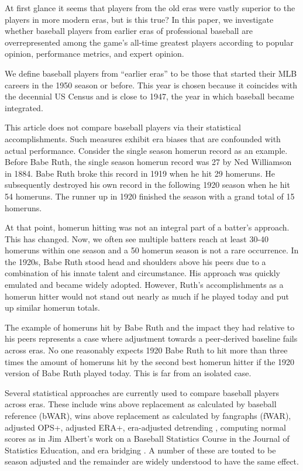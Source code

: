\documentclass[11pt]{article}\usepackage[]{graphicx}\usepackage[]{color}
\begin{document}
At first glance 
it seems that players from the old eras were vastly superior to the 
players in more modern eras, but is this true? 
In this paper, we investigate whether baseball players from earlier 
eras of professional baseball are overrepresented among the game's all-time 
greatest players according to popular opinion, performance metrics, and expert 
opinion.  

We define baseball players from ``earlier eras'' to be those that 
started their MLB careers in the 1950 season or before.  
This year is chosen because it coincides with the decennial US Census 
and is close to 1947, the year in which baseball became integrated. 

This article does not compare baseball players via their statistical 
accomplishments.  Such measures exhibit era biases that are confounded with 
actual performance.  Consider the single season homerun record as an example. 
Before Babe Ruth, the single season homerun record was 27 by Ned Williamson in 
1884.  
Babe Ruth broke this record in 1919 
when he hit 29 homeruns.  He subsequently destroyed his own record in 
the following 1920 season when he hit 54 homeruns.  The runner up in 1920 
finished the season with a grand total of 15 homeruns.  

At that point, 
homerun hitting was not an integral part of a batter's approach. %
This has changed. Now, we often see multiple batters reach at least 30-40 
homeruns within one season and a 50 homerun season is not a rare 
occurrence. %
In the 1920s, Babe Ruth stood head and shoulders above his peers due to a 
combination of his innate talent and circumstance.  
His approach was quickly emulated and became widely adopted. %
However, Ruth's accomplishments as a homerun hitter would not stand out nearly 
as much if he played today and put up similar homerun totals.    

The example of homeruns hit by Babe Ruth and the impact they had relative 
to his peers represents a case where adjustment towards a peer-derived 
baseline fails across eras.  No one reasonably expects 1920 Babe Ruth to hit 
more than three times the amount of homeruns hit by the second best homerun 
hitter if the 1920 version of Babe Ruth played today.  
This is far from an isolated case.  

Several statistical approaches are currently used to compare baseball 
players across eras. 
These include 
wins above replacement as calculated by baseball reference (bWAR), %
wins above replacement as calculated by fangraphs (fWAR), %
adjusted OPS+, %
adjusted ERA+, %
era-adjusted detrending \citep{petersen}, 
computing normal scores as in Jim Albert's work on a Baseball Statistics Course 
in the Journal of Statistics Education, 
and era bridging \citep{berry1999eras}. 
A number of these are touted to be season adjusted and the remainder are 
widely understood to have the same effect.  
\end{document}
